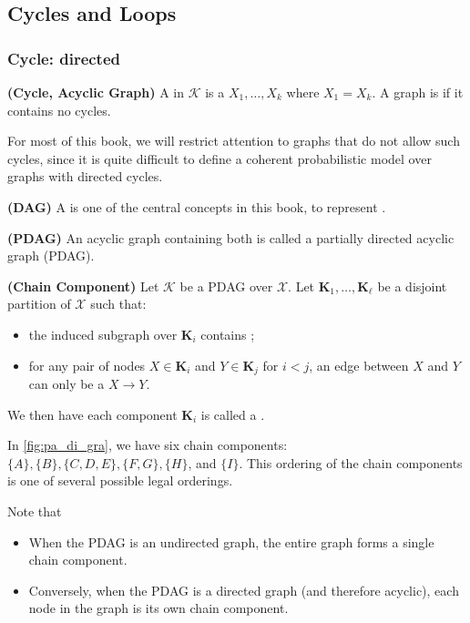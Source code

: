 \documentclass{article}
\newcommand{\bfs}[1]{\textbf{({#1}) }}
\begin{document}
\subsection{Cycles and Loops}
\subsubsection{Cycle: directed}
\begin{defa}\bfs{Cycle, Acyclic Graph}
 A  in $\mathcal{K}$ is a  $X_{1}, \ldots, X_{k}$ where $X_{1}=X_{k} .$ A graph is  if it contains no cycles.
\end{defa}


For most of this book, we will restrict attention to graphs that do not allow such cycles, since it is quite difficult to define a coherent probabilistic model over graphs with directed cycles.
\begin{defa}\bfs{DAG}
 A  is one of the central concepts in this book, to represent . 
\end{defa}

\begin{defa}\bfs{PDAG}\label{def:cadfe}
 An acyclic graph containing both  is called a partially directed acyclic graph (PDAG).
\end{defa}
\begin{defa}\bfs{Chain Component}
Let $\mathcal{K}$ be a PDAG over $\mathcal{X}$.  { Let } $\boldsymbol{K}_{1}, \ldots, \boldsymbol{K}_{\ell}$ be a disjoint partition of $\mathcal{X}$ such that:
\begin{itemize}
    \item the induced subgraph over $\boldsymbol{K}_{i}$ contains ;
    \item for any pair of nodes $X \in \boldsymbol{K}_{i}$ and $Y \in \boldsymbol{K}_{j}$ for $i<j$, an edge between $X$ and $Y$ can only be a  $X \rightarrow Y$.
\end{itemize}
We then have each component $\boldsymbol{K}_{i}$ is called a .
\end{defa}
\begin{exma}
In \cref{fig:pa_di_gra}, we have six chain components: $\{A\},\{B\},\{C, D, E\},\{F, G\},\{H\}$, and $\{I\}$. This ordering of the chain components is one of several possible legal orderings.
\end{exma}
\begin{rema}
Note that
\begin{itemize}
    \item When the PDAG is an undirected graph, the entire graph forms a single chain component. 
    \item Conversely, when the PDAG is a directed graph (and therefore acyclic), each node in the graph is its own chain component.
\end{itemize}
\end{rema}
\end{document}
